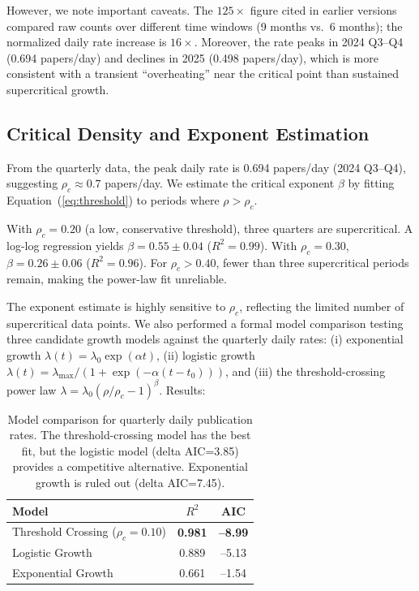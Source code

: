 \documentclass[12pt]{article}
\begin{document}
However, we note important caveats. The $125\times$ figure cited in earlier versions compared raw counts over different time windows (9 months vs.\ 6 months); the normalized daily rate increase is $16\times$. Moreover, the rate peaks in 2024 Q3--Q4 (0.694 papers/day) and declines in 2025 (0.498 papers/day), which is more consistent with a transient ``overheating'' near the critical point than sustained supercritical growth.

\subsection{Critical Density and Exponent Estimation}

From the quarterly data, the peak daily rate is 0.694 papers/day (2024 Q3--Q4), suggesting $\rho_c \approx 0.7$ papers/day. We estimate the critical exponent $\beta$ by fitting Equation~(\ref{eq:threshold}) to periods where $\rho > \rho_c$.

With $\rho_c = 0.20$ (a low, conservative threshold), three quarters are supercritical. A log-log regression yields $\beta = 0.55 \pm 0.04$ ($R^2 = 0.99$). With $\rho_c = 0.30$, $\beta = 0.26 \pm 0.06$ ($R^2 = 0.96$). For $\rho_c > 0.40$, fewer than three supercritical periods remain, making the power-law fit unreliable.

The exponent estimate is highly sensitive to $\rho_c$, reflecting the limited number of supercritical data points. We also performed a formal model comparison testing three candidate growth models against the quarterly daily rates: (i) exponential growth $\lambda(t)=\lambda_0\exp(\alpha t)$, (ii) logistic growth $\lambda(t)=\lambda_{\max}/(1+\exp(-\alpha(t-t_0)))$, and (iii) the threshold-crossing power law $\lambda=\lambda_0(\rho/\rho_c-1)^\beta$. Results:

\begin{table}[htbp]
  \centering
  \begin{tabular}{lcc}
    \toprule
    Model & $R^2$ & AIC \\
    \midrule
    Threshold Crossing ($\rho_c=0.10$) & \textbf{0.981} & \textbf{--8.99} \\
    Logistic Growth & 0.889 & --5.13 \\
    Exponential Growth & 0.661 & --1.54 \\
    \bottomrule
  \end{tabular}
  \caption{Model comparison for quarterly daily publication rates. The threshold-crossing model has the best fit, but the logistic model (delta AIC=3.85) provides a competitive alternative. Exponential growth is ruled out (delta AIC=7.45).}
  \label{tab:model-comparison}
\end{table}
\end{document}
